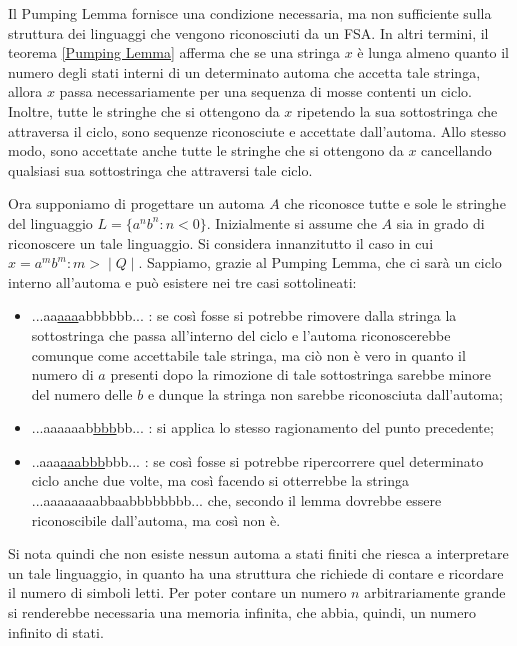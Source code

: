   Il Pumping Lemma fornisce una condizione necessaria, ma non sufficiente sulla struttura dei linguaggi che vengono riconosciuti da un FSA. In altri termini, il teorema \ref{Pumping Lemma} afferma che se una stringa \(x\) è lunga almeno quanto il numero degli stati interni di un determinato automa che accetta tale stringa, allora \(x\) passa necessariamente per una sequenza di mosse contenti un ciclo. Inoltre, tutte le stringhe che si ottengono da \(x\) ripetendo la sua sottostringa che attraversa il ciclo, sono sequenze riconosciute e accettate dall’automa. Allo stesso modo, sono accettate anche tutte le stringhe che si ottengono da \(x\) cancellando qualsiasi sua sottostringa che attraversi tale ciclo.

  Ora supponiamo di progettare un automa \(A\) che riconosce tutte e sole le stringhe del linguaggio \(L=\{a^nb^n : n<0\}\). Inizialmente si assume che \(A\) sia in grado di riconoscere un tale linguaggio. Si considera innanzitutto il caso in cui \(x=a^mb^m : m>\;|\;Q\;|\;\). Sappiamo, grazie al Pumping Lemma, che ci sarà un ciclo interno all’automa e può esistere nei tre casi sottolineati:

  \begin{itemize}
    \item ...aa\underline{aaa}abbbbbb... : se così fosse si potrebbe rimovere dalla stringa la sottostringa che passa all'interno del ciclo e l’automa riconoscerebbe comunque come accettabile tale stringa, ma ciò non è vero in quanto il numero di \(a\) presenti dopo la rimozione di tale sottostringa sarebbe minore del numero delle \(b\) e dunque la stringa non sarebbe riconosciuta dall’automa;
    \item ...aaaaaab\underline{bbb}bb... : si applica lo stesso ragionamento del punto precedente;
    \item ..aaa\underline{aaabbb}bbb... : se così fosse si potrebbe ripercorrere quel determinato ciclo anche due volte, ma così facendo si otterrebbe la stringa ...aaaaaaaabbaabbbbbbbb... che, secondo il lemma dovrebbe essere riconoscibile dall’automa, ma così non è.
  \end{itemize}

  Si nota quindi che non esiste nessun automa a stati finiti che riesca a interpretare un tale linguaggio, in quanto ha una struttura che richiede di contare e ricordare il numero di simboli letti. Per poter contare un numero \(n\) arbitrariamente grande si renderebbe necessaria una memoria infinita, che abbia, quindi, un numero infinito di stati.

